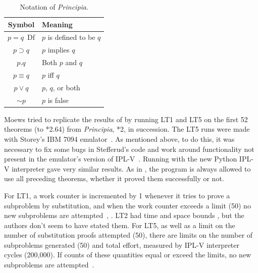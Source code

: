 \documentclass{IEEEcsmag}
\begin{document}
\begin{table}[h]
\centering
\caption{Notation of \textit{Principia}.}
\label{tab:notation}
\begin{tabular}{cl}
\toprule
\textbf{Symbol} & \textbf{Meaning} \\
\midrule
$p=q$\ {\rm Df} & $p$ is defined to be $q$ \\
$p\supset q$ & $p$ implies $q$ \\
$p.q$ & Both $p$ and $q$ \\
$p\equiv q$ & $p$ iff $q$ \\
$p\vee q$ & $p$, $q$, or both \\
$\sim p$ & $p$ is false  \\
\bottomrule
\end{tabular}
\end{table}

Moews tried to replicate the results of \cite{LT1957}
by running LT1 and LT5 on the first 52 theorems (to *2.64)
from {\em Principia}, *2, in 
succession.  The LT5 runs were made with Storey's
IBM 7094 emulator~\cite{ibsys}.  As mentioned above,
to do this, it was
necessary to fix some bugs in Stefferud's code and work 
around functionality not present in the emulator's version
of IPL-V~\cite{moewsrepo2}.  Running with the new Python
IPL-V interpreter gave very similar results.
As in \cite{LT1957}, 
the program is always allowed to use
all preceding theorems, whether it proved them successfully
or not.  

%
%
For LT1, a work counter is incremented by 1 whenever it tries
to prove a subproblem by substitution, and when the work counter
exceeds a limit (50) no new subproblems are 
attempted~\cite{moewsrepo}, \cite[p.~47]{LT1956b}.
LT2 had time and space bounds \cite[p.~223]{LT1957},
but the authors don't seem to have stated them.
%
%
For LT5, as well as a limit on the number of substitution proofs
attempted (50), there are limits on the number of subproblems
generated (50) and total effort, measured by IPL-V interpreter cycles (200,000).
If counts of these quantities equal or exceed the limits,
no new subproblems are attempted~\cite[pp.~154-155]{stefferud1963lt}.
\end{document}
